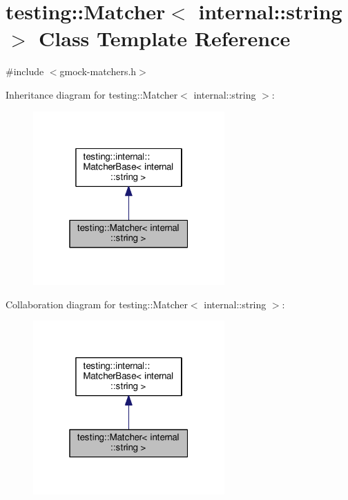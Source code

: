 \hypertarget{classtesting_1_1Matcher_3_01internal_1_1string_01_4}{}\section{testing\+:\+:Matcher$<$ internal\+:\+:string $>$ Class Template Reference}
\label{classtesting_1_1Matcher_3_01internal_1_1string_01_4}


{\ttfamily \#include $<$gmock-\/matchers.\+h$>$}



Inheritance diagram for testing\+:\+:Matcher$<$ internal\+:\+:string $>$\+:\nopagebreak
\begin{figure}[H]
\begin{center}
\leavevmode
\includegraphics[width=208pt]{classtesting_1_1Matcher_3_01internal_1_1string_01_4__inherit__graph}
\end{center}
\end{figure}


Collaboration diagram for testing\+:\+:Matcher$<$ internal\+:\+:string $>$\+:\nopagebreak
\begin{figure}[H]
\begin{center}
\leavevmode
\includegraphics[width=208pt]{classtesting_1_1Matcher_3_01internal_1_1string_01_4__coll__graph}
\end{center}
\end{figure}
